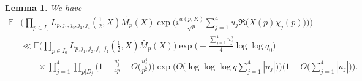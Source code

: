 \documentclass[12pt, reqno]{amsart}
\newcommand{\E}{\mathbb{E}}
\newtheorem{lemma}[theorem]{Lemma}
\numberwithin{equation}{section}
\numberwithin{theorem}{section}
\numberwithin{equation}{section}
\begin{document}
\begin{lemma}\label{not1234}
     We have 
   \begin{align*}
       \E & \Bigg( \prod_{p \in I_0} L_{p,j_1,j_2,j_3,j_4}( \tfrac{1}{2},X) \widetilde{M_p}(X) \exp \bigg(  i \frac{a(p;K)}{
    \sqrt{p}}\sum_{j=1}^4   u_j \Re \big(X(p) \chi_j(p)\big)\bigg) \Bigg) \\
    & \ll  \E \Bigg( \prod_{p \in I_0} L_{p,j_1,j_2,j_3,j_4}( \tfrac{1}{2},X) \widetilde{M_p}(X) \Bigg) \exp \Big(  - \frac{\sum_{j=1}^4 u_j^2}{4} \log \log q_0 \Big) \\
    &\qquad \times \prod_{j=1}^4 \prod_{p|D_j} \bigg(  1+ \frac{u_j^2}{4p} + O \Big( \frac{u_j^4}{p^2} \Big)\bigg)\exp \bigg( O \Big(  \log \log \log q \sum_{j=1}^4 |u_j|\Big) \bigg) \bigg(1 +O \Big(  \sum_{j=1}^4 |u_j|\Big) \bigg). 
    \end{align*}
    \end{lemma}
\end{document}

